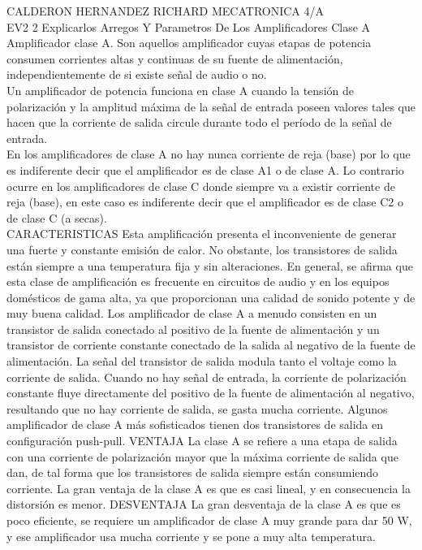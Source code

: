 \documentclass[12pt]{article}
\begin{document}
CALDERON HERNANDEZ RICHARD
MECATRONICA 4/A 
\\[2cm]
EV2 2 Explicarlos Arregos Y Parametros De Los Amplificadores Clase A
\\[2cm]
Amplificador clase A. Son aquellos amplificador cuyas etapas de potencia consumen corrientes altas y continuas de su fuente de alimentación, independientemente de si existe señal de audio o no. 
\\[1cm]
Un amplificador de potencia funciona en clase A cuando la tensión de polarización y la amplitud máxima de la señal de entrada poseen valores tales que hacen que la corriente de salida circule durante todo el período de la señal de entrada.
\\[1cm]
En los amplificadores de clase A no hay nunca corriente de reja (base) por lo que es indiferente decir que el amplificador es de clase A1 o de clase A. Lo contrario ocurre en los amplificadores de clase C donde siempre va a existir corriente de reja (base), en este caso es indiferente decir que el amplificador es de clase C2 o de clase C (a secas).
\\[1cm]
CARACTERISTICAS
Esta amplificación presenta el inconveniente de generar una fuerte y constante emisión de calor. No obstante, los transistores de salida están siempre a una temperatura fija y sin alteraciones. 
En general, se afirma que esta clase de amplificación es frecuente en circuitos de audio y en los equipos domésticos de gama alta, ya que proporcionan una calidad de sonido potente y de muy buena calidad. 
Los amplificador de clase A a menudo consisten en un transistor de salida conectado al positivo de la fuente de alimentación y un transistor de corriente constante conectado de la salida al negativo de la fuente de alimentación. 
La señal del transistor de salida modula tanto el voltaje como la corriente de salida. Cuando no hay señal de entrada, la corriente de polarización constante fluye directamente del positivo de la fuente de alimentación al negativo, resultando que no hay corriente de salida, se gasta mucha corriente. Algunos amplificador de clase A más sofisticados tienen dos transistores de salida en configuración push-pull. 
VENTAJA
La clase A se refiere a una etapa de salida con una corriente de polarización mayor que la máxima corriente de salida que dan, de tal forma que los transistores de salida siempre están consumiendo corriente. La gran ventaja de la clase A es que es casi lineal, y en consecuencia la distorsión es menor. 
DESVENTAJA
La gran desventaja de la clase A es que es poco eficiente, se requiere un amplificador de clase A muy grande para dar 50 W, y ese amplificador usa mucha corriente y se pone a muy alta temperatura. 
\end{document}
